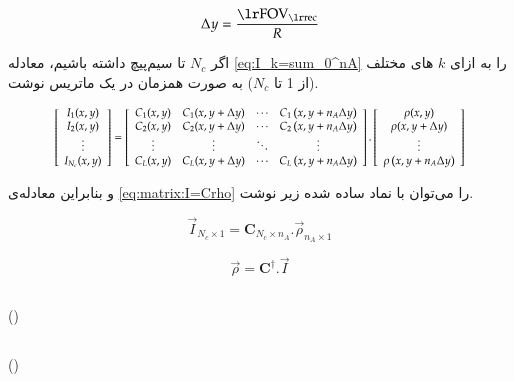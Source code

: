 \removevspace
\begin{equation}
	\Delta y = \dfrac{\lrtext{FOV}_{\lrtext{rec}}}{R}
\end{equation}

اگر $N_c$ تا سیم‌پیچ داشته باشیم، 
معادله \ref{eq:I_k=sum_0^nA}
را به ازای $k$ های مختلف (از 1 تا $N_c$)
به صورت همزمان در یک ماتریس نوشت.


\begin{equation}\label{eq:matrix:I=Crho}
	\rescaleequation{0.85}{
	\left[\begin{array}{c}
		I_1(x, y) \\
		I_2(x, y) \\
		\vdots \\
		I_{N_c}(x, y)
	\end{array}\right]
	=\left[\begin{array}{cccc}
		C_{1}(x, y) & C_{1}(x, y+\Delta y) & \cdots & C_{1}\left(x, y+n_{A} \Delta y\right) \\
		C_{2}(x, y) & C_{2}(x, y+\Delta y) & \cdots & C_{2}\left(x, y+n_{A} \Delta y\right) \\
		\vdots & \vdots & \ddots & \vdots \\
		C_{L}(x, y) & C_{L}(x, y+\Delta y) & \cdots & C_{L}\left(x, y+n_{A} \Delta y\right)
	\end{array}\right]
	.
	\left[\begin{array}{c}
		\rho(x, y) \\
		\rho(x, y+\Delta y) \\
		\vdots \\
		\rho\left(x, y+n_{A} \Delta y\right)
	\end{array}\right]}
\end{equation}

و بنابراین معادله‌ی 
\ref{eq:matrix:I=Crho}
را می‌توان با نماد ساده شده زیر نوشت.

\removevspace
\begin{equation}
	\vec{I}_{N_c\times1} = \mathbf{C}_{N_c \times n_A} . \vec{\rho}_{n_A\times1}
\end{equation}

\removevspace
\begin{equation}
	\vec{\rho} = \mathbf{C}^\dagger . \vec{I}
\end{equation}

\FloatBarrier
\subsection{}

()

\FloatBarrier
\subsection{}

()

\cite{GRAPPA-Griswold2002}








